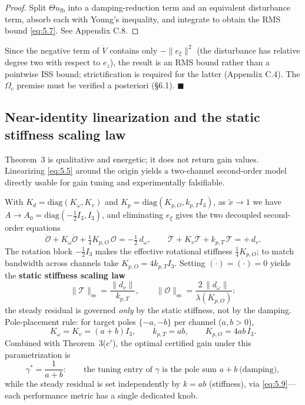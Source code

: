 \begin{proof}
Split $\Theta u_{\mathrm{fb}}$ into a damping-reduction term and an equivalent disturbance term, absorb each with Young's inequality, and integrate to obtain the RMS bound \eqref{eq:5.7}. See Appendix C.8.
\end{proof}

\begin{remark}
Since the negative term of $\dot V$ contains only $-\|e_\xi\|^2$ (the disturbance has relative degree two with respect to $e_z$), the result is an RMS bound rather than a pointwise ISS bound; strictification is required for the latter (Appendix C.4). The $\Omega_c$ premise must be verified a posteriori (\S6.1). $\blacksquare$
\end{remark}

\subsection{Near-identity linearization and the static stiffness scaling law}

Theorem~3 is qualitative and energetic; it does not return gain values. Linearizing \eqref{eq:5.5} around the origin yields a two-channel second-order model directly usable for gain tuning and experimentally falsifiable.

With $K_d=\mathrm{diag}(K_\omega,K_v)$ and $K_p=\mathrm{diag}(K_{p,O},k_{p,T}I_3)$, as $\tilde x\to1$ we have $A\to A_0=\mathrm{diag}(-\tfrac12I_3,I_3)$, and eliminating $e_\xi$ gives the two decoupled second-order equations
\begin{equation}
\ddot{\mathcal O}+K_\omega\dot{\mathcal O}+\tfrac14K_{p,O}\,\mathcal O=-\tfrac12\,d_\omega ,
\qquad
\ddot{\mathcal T}+K_v\dot{\mathcal T}+k_{p,T}\,\mathcal T=+\,d_v .
\tag{5.8}\label{eq:5.8}
\end{equation}
The rotation block $-\tfrac12I_3$ makes the effective rotational stiffness $\tfrac14K_{p,O}$; to match bandwidth across channels take $K_{p,O}=4k_{p,T}I_3$. Setting $\ddot{(\cdot)}=\dot{(\cdot)}=0$ yields the \textbf{static stiffness scaling law}
\begin{equation}
\|\mathcal T\|_{\mathrm{ss}}=\frac{\|d_v\|}{k_{p,T}} ,
\qquad
\|\mathcal O\|_{\mathrm{ss}}=\frac{2\,\|d_\omega\|}{\lambda(K_{p,O})} :
\tag{5.9}\label{eq:5.9}
\end{equation}
the steady residual is governed \emph{only} by the static stiffness, not by the damping. Pole-placement rule: for target poles $\{-a,-b\}$ per channel ($a,b>0$),
\begin{equation*}
K_\omega=K_v=(a+b)I_3,\qquad k_{p,T}=ab,\qquad K_{p,O}=4ab\,I_3 .
\end{equation*}
Combined with Theorem~3(c$'$), the optimal certified gain under this parametrization is
\begin{equation*}
\gamma^{*}=\frac{1}{a+b}:\qquad
\text{the tuning entry of }\gamma\text{ is the pole sum }a+b\ \text{(damping)},
\end{equation*}
while the steady residual is set independently by $k=ab$ (stiffness), via \eqref{eq:5.9}---each performance metric has a single dedicated knob.

